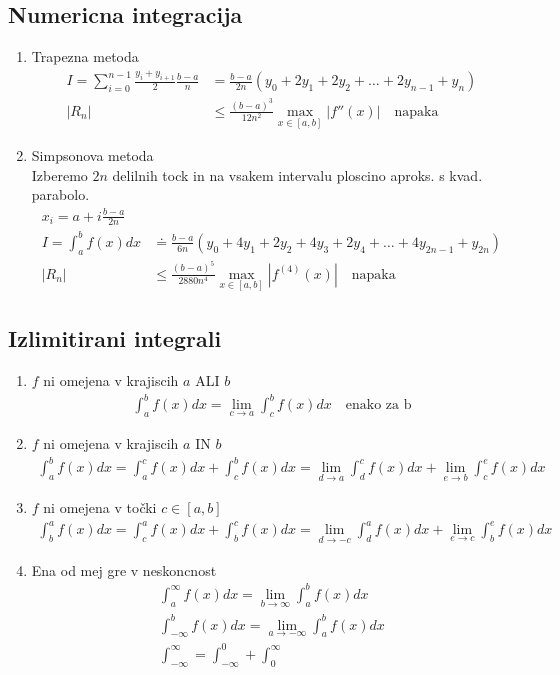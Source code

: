 \documentclass[a4paper,oneside,8pt]{extarticle}
\theoremstyle{definition}
\newcommand\abs[1]{\left|#1\right|}
\begin{document}
\begin{multicols}{2}
	\subsection*{Numericna integracija}
	\begin{enumerate}
		\item Trapezna metoda
		\begin{align*}
			I = \sum_{i=0}^{n-1} \frac{y_i +y_{i+1}}{2} \frac{b - a}{n} &= \frac{b-a}{2n} (y_0 + 2y_1 + 2y_2 + \dots + 2y_{n-1} + y_{n})\\
			\abs{R_n} &\leq \frac{(b-a)^3}{12n^2} \max_{x \in [a,b]} \abs{f''(x)} \quad \text{napaka}
		\end{align*}
		\item Simpsonova metoda\\
		Izberemo $2n$ delilnih tock in na vsakem intervalu ploscino aproks. s kvad. parabolo.
		\begin{align*}
			x_i = a + i\frac{b-a}{2n}\\
			I = \int_{a}^{b} f(x)dx &\doteq \frac{b-a}{6n} (y_0 + 4y_1 + 2y_2 + 4y_3 + 2y_4 + \dots + 4y_{2n-1} + y_{2n})\\
			\abs{R_n} &\leq \frac{(b-a)^5}{2880n^4} \max_{x \in [a,b]} \abs{f^{(4)}(x)} \quad \text{napaka}
		\end{align*}
	\end{enumerate}
%
	\subsection*{Izlimitirani integrali}
	\begin{enumerate}
		\item $f$ ni omejena v krajiscih $a$ ALI $b$
		\begin{align*}
			\int_{a}^{b} f(x)dx = \lim_{c \to a} \int_{c}^{b} f(x)dx \quad \text{enako za b}
		\end{align*}
		\item $f$ ni omejena v krajiscih $a$ IN $b$
		\begin{align*}
			\int_{a}^{b} f(x)dx = \int_{a}^{c} f(x)dx + \int_{c}^{b} f(x)dx = \lim_{d\to a} \int_{d}^{c} f(x)dx + \lim_{e\to b} \int_{c}^{e} f(x)dx  
		\end{align*}
		\item $f$ ni omejena v točki $c \in [a,b]$
		\begin{align*}
			\int_{b}^{a} f(x)dx = \int_{c}^{a} f(x)dx + \int_{b}^{c} f(x)dx = \lim_{d \to -c} \int_{d}^{a} f(x)dx + \lim_{e \to c} \int_{b}^{e} f(x)dx
		\end{align*}
		\item Ena od mej gre v neskoncnost
		\begin{align*}
			\int_{a}^{\infty} f(x)dx = \lim_{b \to \infty}\int_{a}^{b} f(x)dx\\
			\int_{-\infty}^{b} f(x)dx = \lim_{a \to -\infty}\int_{a}^{b} f(x)dx\\
			\int_{-\infty}^{\infty} = \int_{-\infty}^{0} + \int_{0}^{\infty}
		\end{align*}
	\end{enumerate}
%

\end{multicols}
\end{document}
